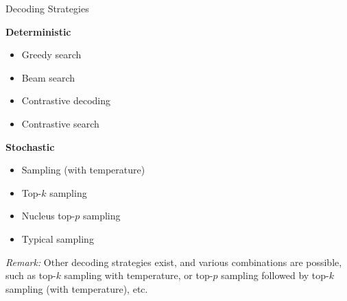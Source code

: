 
\begin{vbframe}{Decoding Strategies}



\textbf{Deterministic}
\begin{itemize}
    \item Greedy search
    \item Beam search
    \item Contrastive decoding 
    \item Contrastive search 
\end{itemize}

\textbf{Stochastic}
\begin{itemize}
    \item Sampling (with temperature) 
    \item Top-$k$ sampling 
    \item Nucleus top-$p$ sampling 
    \item Typical sampling 
\end{itemize}
\vspace{1ex}

\textit{Remark:} Other decoding strategies exist, and various combinations are possible, such as top-$k$ sampling with temperature, or top-$p$ sampling followed by top-$k$ sampling (with temperature), etc.
\end{vbframe}


\endlecture
